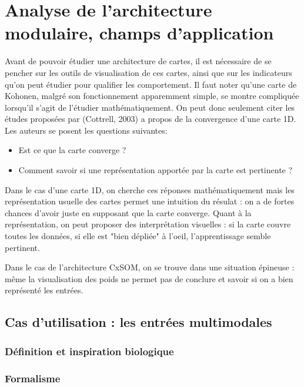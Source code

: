 \chapter{Analyse de l'architecture modulaire, champs d'application}

\graphicspath{{03-Algorithme/}}

Avant de pouvoir étudier une architecture de cartes, il est nécessaire de se pencher sur les outils de visualisation de ces cartes, ainsi que sur les indicateurs qu'on peut étudier pour qualifier les comportement. 
Il faut noter qu'une carte de Kohonen, malgré son fonctionnement apparemment simple, se montre compliquée lorsqu'il s'agit de l'étudier mathématiquement. On peut donc seulement citer les études proposées par (Cottrell, 2003) a propos de la convergence d'une carte 1D. Les auteurs se posent les questions suivantes: 
\begin{itemize}
\item Est ce que la carte converge ? 
\item Comment savoir si une représentation apportée par la carte est pertinente ?  
\end{itemize}

Dans le cas d'une carte 1D, on cherche ces réponses mathématiquement mais les représentation usuelle des cartes permet une intuition du résulat : on a de fortes chances d'avoir juste en supposant que la carte converge. Quant à la représentation, on peut proposer des interprétation visuelles : si la carte couvre toutes les données, si elle est "bien dépliée" à l'oeil, l'apprentissage semble pertinent.

Dans le cas de l'architecture CxSOM, on se trouve dans une situation épineuse : même la visualisation des poids ne permet pas de conclure et savoir si on a bien représenté les entrées. 


\section{Cas d'utilisation : les entrées multimodales}

\subsection{Définition et inspiration biologique}



\subsection{Formalisme}




